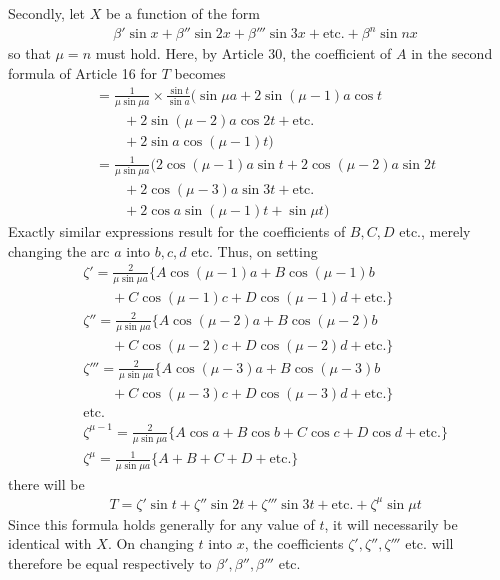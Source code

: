 \begingroup
\renewcommand{\arraystretch}{1.45}
Secondly, let $X$ be a function of the form
\[
\begin{aligned}
&\beta'\sin x+\beta''\sin2x+\beta'''\sin3x+\text{etc.}+\beta^n\sin nx
\end{aligned}
\]
so that $\mu=n$ must hold. Here, by Article 30, the coefficient of $A$ in the second formula of Article 16 for $T$ becomes
\[
\begin{aligned}
&=\frac{1}{\mu\sin\mu a}\times\frac{\sin t}{\sin a}(\sin\mu a+2\sin(\mu-1)a\cos t\\[5pt]
&\qquad{}+2\sin(\mu-2)a\cos2t+\text{etc.}\\[5pt]
&\qquad+2\sin a\cos(\mu-1)t)\\[5pt]
&=\frac{1}{\mu\sin\mu a}(2\cos(\mu-1)a\sin t+2\cos(\mu-2)a\sin2t\\[5pt]
&\qquad{}+2\cos(\mu-3)a\sin3t+\text{etc.}\\[5pt]
&\qquad+2\cos a\sin(\mu-1)t+\sin\mu t)
\end{aligned}
\]
Exactly similar expressions result for the coefficients of $B,C,D$ etc., merely changing the arc $a$ into $b,c,d$ etc. Thus, on setting
\[
\begin{aligned}
&\zeta'=\frac{2}{\mu\sin\mu a}\{A\cos(\mu-1)a+B\cos(\mu-1)b\\[5pt]
&\qquad{}+C\cos(\mu-1)c+D\cos(\mu-1)d+\text{etc.}\}\\[5pt]
&\zeta''=\frac{2}{\mu\sin\mu a}\{A\cos(\mu-2)a+B\cos(\mu-2)b\\[5pt]
&\qquad{}+C\cos(\mu-2)c+D\cos(\mu-2)d+\text{etc.}\}\\[5pt]
&\zeta'''=\frac{2}{\mu\sin\mu a}\{A\cos(\mu-3)a+B\cos(\mu-3)b\\[5pt]
&\qquad{}+C\cos(\mu-3)c+D\cos(\mu-3)d+\text{etc.}\}\\[5pt]
&\text{etc.}\\[5pt]
&\zeta^{\mu-1}=\frac{2}{\mu\sin\mu a}\{A\cos a+B\cos b+C\cos c+D\cos d+\text{etc.}\}\\[5pt]
&\zeta^\mu=\frac{1}{\mu\sin\mu a}\{A+B+C+D+\text{etc.}\}
\end{aligned}
\]
there will be
\[
\begin{aligned}
&T=\zeta'\sin t+\zeta''\sin2t+\zeta'''\sin3t+\text{etc.}+\zeta^\mu\sin\mu t
\end{aligned}
\]
Since this formula holds generally for any value of $t$, it will necessarily
be identical with $X$. On changing $t$ into $x$, the coefficients $\zeta',\zeta'',\zeta'''$ etc. will therefore be equal respectively to $\beta',\beta'',\beta'''$ etc.

